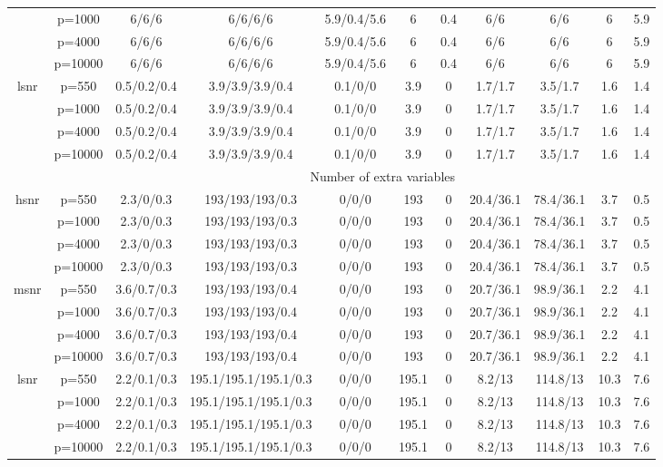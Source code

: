 \begin{table}[ht]
{\begin{tabular}{|c|c|ccccccccc|}
   & p=1000 & 6/6/6 & 6/6/6/6 & 5.9/0.4/5.6 & 6 & 0.4 & 6/6 & 6/6 & 6 & 5.9 \\ 
   & p=4000 & 6/6/6 & 6/6/6/6 & 5.9/0.4/5.6 & 6 & 0.4 & 6/6 & 6/6 & 6 & 5.9 \\ 
   & p=10000 & 6/6/6 & 6/6/6/6 & 5.9/0.4/5.6 & 6 & 0.4 & 6/6 & 6/6 & 6 & 5.9 \\ 
  \midrule\multirow{4}[2]{*}{lsnr} & p=550 & 0.5/0.2/0.4 & 3.9/3.9/3.9/0.4 & 0.1/0/0 & 3.9 & 0 & 1.7/1.7 & 3.5/1.7 & 1.6 & 1.4 \\ 
   & p=1000 & 0.5/0.2/0.4 & 3.9/3.9/3.9/0.4 & 0.1/0/0 & 3.9 & 0 & 1.7/1.7 & 3.5/1.7 & 1.6 & 1.4 \\ 
   & p=4000 & 0.5/0.2/0.4 & 3.9/3.9/3.9/0.4 & 0.1/0/0 & 3.9 & 0 & 1.7/1.7 & 3.5/1.7 & 1.6 & 1.4 \\ 
   & p=10000 & 0.5/0.2/0.4 & 3.9/3.9/3.9/0.4 & 0.1/0/0 & 3.9 & 0 & 1.7/1.7 & 3.5/1.7 & 1.6 & 1.4 \\ 
   \midrule 
 \multicolumn{1}{|c}{} &       & \multicolumn{9}{c|}{Number of extra variables} \\
\midrule\multirow{4}[2]{*}{hsnr} & p=550 & 2.3/0/0.3 & 193/193/193/0.3 & 0/0/0 & 193 & 0 & 20.4/36.1 & 78.4/36.1 & 3.7 & 0.5 \\ 
   & p=1000 & 2.3/0/0.3 & 193/193/193/0.3 & 0/0/0 & 193 & 0 & 20.4/36.1 & 78.4/36.1 & 3.7 & 0.5 \\ 
   & p=4000 & 2.3/0/0.3 & 193/193/193/0.3 & 0/0/0 & 193 & 0 & 20.4/36.1 & 78.4/36.1 & 3.7 & 0.5 \\ 
   & p=10000 & 2.3/0/0.3 & 193/193/193/0.3 & 0/0/0 & 193 & 0 & 20.4/36.1 & 78.4/36.1 & 3.7 & 0.5 \\ 
  \midrule\multirow{4}[2]{*}{msnr} & p=550 & 3.6/0.7/0.3 & 193/193/193/0.4 & 0/0/0 & 193 & 0 & 20.7/36.1 & 98.9/36.1 & 2.2 & 4.1 \\ 
   & p=1000 & 3.6/0.7/0.3 & 193/193/193/0.4 & 0/0/0 & 193 & 0 & 20.7/36.1 & 98.9/36.1 & 2.2 & 4.1 \\ 
   & p=4000 & 3.6/0.7/0.3 & 193/193/193/0.4 & 0/0/0 & 193 & 0 & 20.7/36.1 & 98.9/36.1 & 2.2 & 4.1 \\ 
   & p=10000 & 3.6/0.7/0.3 & 193/193/193/0.4 & 0/0/0 & 193 & 0 & 20.7/36.1 & 98.9/36.1 & 2.2 & 4.1 \\ 
  \midrule\multirow{4}[2]{*}{lsnr} & p=550 & 2.2/0.1/0.3 & 195.1/195.1/195.1/0.3 & 0/0/0 & 195.1 & 0 & 8.2/13 & 114.8/13 & 10.3 & 7.6 \\ 
   & p=1000 & 2.2/0.1/0.3 & 195.1/195.1/195.1/0.3 & 0/0/0 & 195.1 & 0 & 8.2/13 & 114.8/13 & 10.3 & 7.6 \\ 
   & p=4000 & 2.2/0.1/0.3 & 195.1/195.1/195.1/0.3 & 0/0/0 & 195.1 & 0 & 8.2/13 & 114.8/13 & 10.3 & 7.6 \\ 
   & p=10000 & 2.2/0.1/0.3 & 195.1/195.1/195.1/0.3 & 0/0/0 & 195.1 & 0 & 8.2/13 & 114.8/13 & 10.3 & 7.6 \\ 
   \bottomrule 
\end{tabular}
}
\end{table}
